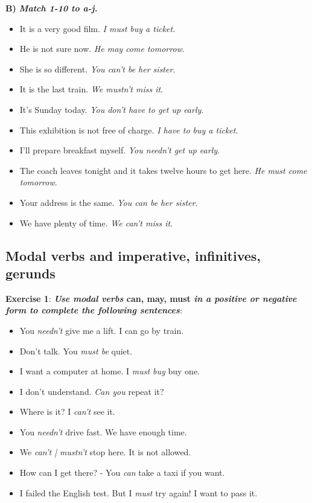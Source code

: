 \textbf{B)} \textbf{\textit{Match 1-10 to a-j.}}

\begin{itemize}

\item It is a very good film. \textit{I must buy a ticket}.
\item He is not sure now. \textit{He may come tomorrow}.
\item She is so different. \textit{You can't be her sister}.
\item It is the last train. \textit{We mustn't miss it}.
\item It's Sunday today. \textit{You don't have to get up early}.
\item This exhibition is not free of charge. \textit{I have to buy a ticket}.
\item I'll prepare breakfast myself. \textit{You needn't get up early}.
\item The coach leaves tonight and it takes twelve hours to get here. \textit{He must come tomorrow}.
\item Your address is the same. \textit{You can be her sister}.
\item We have plenty of time. \textit{We can't miss it}.

\end{itemize}

\subsection{Modal verbs and imperative, infinitives, gerunds}

\textbf{Exercise 1}: \textbf{\textit{Use modal  verbs} can, may, must \textit{in a positive or negative form to complete the following sentences}}:

\begin{itemize}

\item You \textit{needn't} give me a lift. I can go by train.
\item Don't talk. You \textit{must be} quiet.
\item I want a computer at home. I \textit{must buy} buy one.
\item I don't understand. \textit{Can you} repeat it?
\item Where is it? I \textit{can't} see it.
\item You \textit{needn't} drive fast. We have enough time.
\item We \textit{can't | mustn't} stop here. It is not allowed.
\item How can I get there? - You \textit{can} take a taxi if you want.
\item I failed the English test. But I \textit{must} try again! I want to pass it.

\end{itemize}

